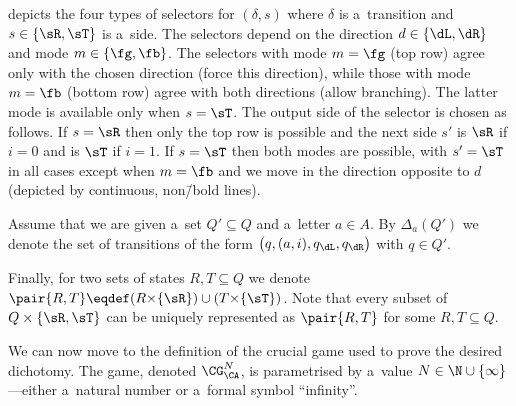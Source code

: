 \documentclass{lmcs}
\numberwithin{equation}{section}
\numberwithin{figure}{section}
\begin{document}
 depicts the four types of selectors for $(\delta, s)$ where $\delta$ is a~transition and $s\in\{\sR,\sT\}$ is a~side. The selectors depend on the direction $d\in\{\dL,\dR\}$ and mode $m\in\{\fg,\fb\}$. The selectors with mode $m=\fg$ (top row) agree only with the chosen direction (force this direction), while those with mode $m=\fb$ (bottom row) agree with both directions (allow branching). The latter mode is available only when $s=\sT$. The output side of the selector is chosen as follows. If $s=\sR$ then only the top row is possible and the next side $s'$ is $\sR$ if $i=0$ and is $\sT$ if $i=1$. If $s=\sT$ then both modes are possible, with $s'=\sT$ in all cases except when $m=\fb$ and we move in the direction opposite to $d$ (depicted by continuous, non\=/bold lines).

Assume that we are given a~set $Q'\subseteq Q$ and a~letter $a\in A$.
By $\Delta_a(Q')$ we denote the set of transitions of the form $\big(q, (a,i), q_\dL,q_\dR\big)$ with $q\in Q'$.

Finally, for two sets of states $R,T\subseteq Q$ we denote $\pair{R,T}\eqdef(R{\times}\{\sR\})\cup(T{\times}\{\sT\})$.
Note that every subset of $Q\times\{\sR,\sT\}$ can be uniquely represented as $\pair{R,T}$ for some $R,T\subseteq Q$.

We can now move to the definition of the crucial game used to prove the desired dichotomy.
The game, denoted $\CG^N_\CA$, is parametrised by a~value $N\in\N\cup\{\infty\}$---either a~natural number or a~formal symbol ``infinity''.
\end{document}
